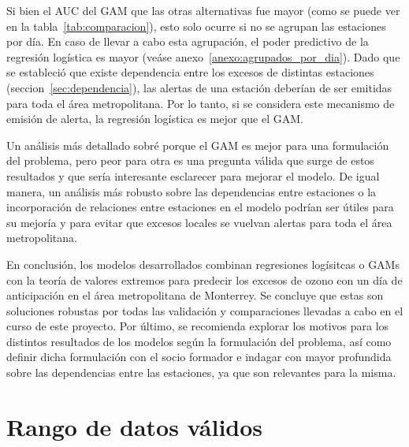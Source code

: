 \documentclass[11pt]{article}
\begin{document}
Si bien el AUC del GAM que las otras alternativas fue mayor (como se puede ver en la tabla~\ref{tab:comparacion}), esto solo ocurre si no se agrupan las estaciones por día. En caso de llevar a cabo esta agrupación, el poder predictivo de la regresión logística es mayor (veáse anexo~\ref{anexo:agrupados_por_dia}). Dado que se estableció que existe dependencia entre los excesos de distintas estaciones (seccion~\ref{sec:dependencia}), las alertas de una estación deberían de ser emitidas para toda el área metropolitana. Por lo tanto, si se considera este mecanismo de emisión de alerta, la regresión logística es mejor que el GAM.

Un análisis más detallado sobré porque el GAM es mejor para una formulación del problema, pero peor para otra es una pregunta válida que surge de estos resultados y que sería interesante esclarecer para mejorar el modelo. De igual manera, un análisis más robusto sobre las dependencias entre estaciones o la incorporación de relaciones entre estaciones en el modelo podrían ser útiles para su mejoría y para evitar que excesos locales se vuelvan alertas para toda el área metropolitana.

En conclusión, los modelos desarrollados combinan regresiones logísitcas o GAMs con la teoría de valores extremos para predecir los excesos de ozono con un día de anticipación en el área metropolitana de Monterrey. Se concluye que estas son soluciones robustas por todas las validación y comparaciones llevadas a cabo en el curso de este proyecto. Por último, se recomienda explorar los motivos para los distintos resultados de los modelos según la formulación del problema, así como definir dicha formulación con el socio formador e indagar con mayor profundida sobre las dependencias entre las estaciones, ya que son relevantes para la misma.

\pagebreak
 
\appendix

\section{Rango de datos válidos}
\label{anexo:rango_valido}
\end{document}

